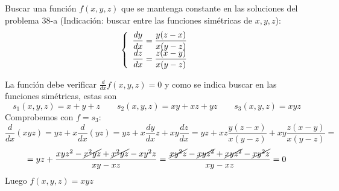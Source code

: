 \begin{ejer}
    Buscar una función $f(x,y,z)$ que se mantenga constante en las soluciones del problema 38-a (Indicación: buscar entre las funciones simétricas de $x,y,z$):
    $$\left\{ \begin{array}{l}
         \dfrac{dy}{dx}=\dfrac{y(z-x)}{x(y-z)}  \\
         \vspace{-5mm} \\
         \dfrac{dz}{dx}=\dfrac{z(x-y)}{x(y-z)} 
    \end{array} \right.$$
\end{ejer}
\begin{sol}
    La función debe verificar $\frac{d}{dx}f(x,y,z)=0$ y como se indica buscar en las funciones simétricas, estas son
    $$s_1(x,y,z)=x+y+z \qquad s_2(x,y,z)=xy+xz+yz \qquad s_3(x,y,z)=xyz$$
    Comprobemos con $f=s_3$:
    $$\dfrac{d}{dx}(xyz)=yz+x\dfrac{d}{dx}(yz)=yz+x\dfrac{dy}{dx}z+xy\dfrac{dz}{dx}=yz+xz\dfrac{y(z-x)}{x(y-z)}+xy\dfrac{z(x-y)}{x(y-z)}= $$
    $$=yz+\dfrac{xyz^2-\cancel{x^2yz}+\cancel{x^2yz}-xy^2z}{xy-xz}=\dfrac{\cancel{xy^2z}-\cancel{xyz^2}+\cancel{xyz^2}-\cancel{xy^2z}}{xy-xz}=0$$
    Luego $f(x,y,z)=xyz$
\end{sol}
